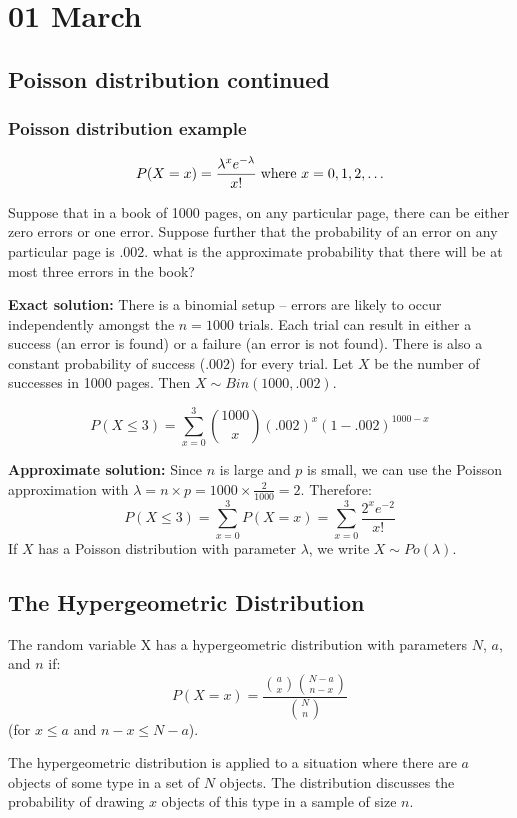 \documentclass[12pt]{article}
\begin{document}
\section{01 March}
\subsection{Poisson distribution continued}
\subsubsection{Poisson distribution example}
\[
    P(X = x) = \frac{\lambda^x e^{- \lambda}}{x!} \; \textnormal{where } x = 0, 1, 2, \ldots
\]

Suppose that in a book of 1000 pages, on any particular page, there can be either zero errors or one error. Suppose further that the probability of an error on any particular page is $.002$. what is the approximate probability that there will be at most three errors in the book?

\textbf{Exact solution:} There is a binomial setup -- errors are likely to occur independently amongst the $n = 1000$ trials. Each trial can result in either a success (an error is found) or a failure (an error is not found). There is also a constant probability of success ($.002$) for every trial. Let $X$ be the number of successes in 1000 pages. Then $X \sim Bin(1000, .002)$.

\[
    P(X \leq 3) = \sum_{x = 0}^{3} {1000 \choose x} (.002)^x (1 - .002)^{1000-x}
\]

\textbf{Approximate solution:} Since $n$ is large and $p$ is small, we can use the Poisson approximation with $\lambda = n \times p = 1000 \times \frac{2}{1000} = 2$. Therefore:
\[
    P(X \leq 3) = \sum_{x = 0}^{3} P(X = x) = \sum_{x=0}^{3} \frac{2^x e^{-2}}{x!}
\]
If $X$ has a Poisson distribution with parameter $\lambda$, we write $X \sim Po(\lambda)$.

\subsection{The Hypergeometric Distribution}

The random variable X has a hypergeometric distribution with parameters $N$, $a$, and $n$ if:
\[
    P(X = x) = \frac{{a \choose x} \binom{N-a}{n-x}}{{N \choose n}}
\]
(for $x \leq a$ and $n-x \leq N-a$).

The hypergeometric distribution is applied to a situation where there are $a$ objects of some type in a set of $N$ objects. The distribution discusses the probability of drawing $x$ objects of this type in a sample of size $n$.
\end{document}
